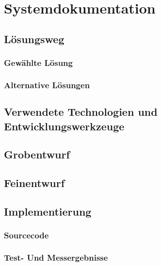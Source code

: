 \chapter{Systemdokumentation}

\section{Lösungsweg}

\subsection{Gewählte Lösung}

\subsection{Alternative Lösungen}

\section{Verwendete Technologien und Entwicklungswerkzeuge}





\section{Grobentwurf}

\section{Feinentwurf}

\section{Implementierung}

\subsection{Sourcecode}

\subsection{Test- Und Messergebnisse}
